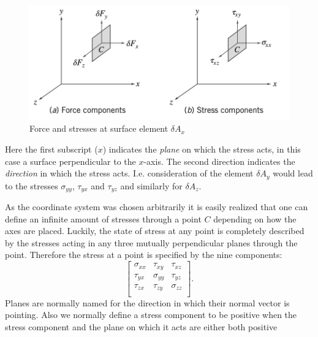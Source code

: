 \begin{figure} [ht]
  \centering
  \includegraphics[width=0.5\linewidth]{./figures/f2_7.png}
  \caption{Force and stresses at surface element $\delta A_x$}
  \label{fig:f2_7}
\end{figure}

Here the first subscript ($x$) indicates the \textit{plane} on which the stress acts, in this case a surface perpendicular to the $x$-axis. The second direction indicates the \textit{direction} in which the stress acts. I.e. consideration of the element $\delta A_y$ would lead to the stresses $\sigma_{yy}$, $\tau_{yx}$ and $\tau_{yz}$ and similarly for $\delta A_{z}$. 

As the coordinate system was chosen arbitrarily it is easily realized that one can define an infinite amount of stresses through a point $C$ depending on how the axes are placed. Luckily, the state of stress at any point is completely described by the stresses acting in any three mutually perpendicular planes through the point. Therefore the stress at a point is specified by the nine components:
\[ 
\begin{bmatrix}
\sigma_{x x} & \tau_{xy} & \tau_{xz}\\
\tau_{yx} & \sigma_{yy} & \tau_{yz}\\
\tau_{z x} & \tau_{zy} & \sigma_{zz}\\
\end{bmatrix}
.\]
Planes are normally named for the direction in which their normal vector is pointing. Also we normally define a stress component to be positive when the stress component and the plane on which it acts are either both positive 

